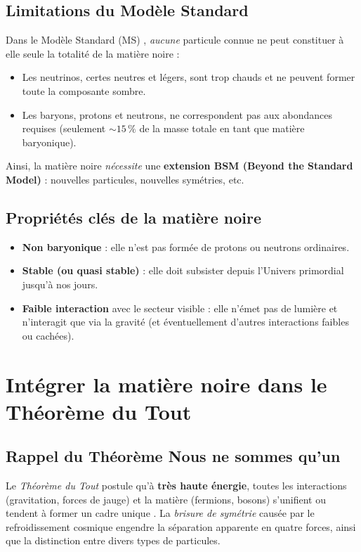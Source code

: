 \documentclass[12pt]{article}
\begin{document}
\subsection{Limitations du Modèle Standard}

Dans le Modèle Standard (MS) \cite{weinberg1995quantum, zee2010qft}, \emph{aucune} particule connue ne peut constituer à elle seule la totalité de la matière noire :
\begin{itemize}
  \item Les neutrinos, certes neutres et légers, sont \og trop chauds \fg{} et ne peuvent former toute la composante sombre.
  \item Les baryons, protons et neutrons, ne correspondent pas aux abondances requises (seulement \(\sim 15\,\%\) de la masse totale en tant que matière baryonique).
\end{itemize}
Ainsi, la matière noire \emph{nécessite} une \textbf{extension BSM (Beyond the Standard Model)} : nouvelles particules, nouvelles symétries, etc.

\subsection{Propriétés clés de la matière noire}

\begin{itemize}
    \item \textbf{Non baryonique} : elle n’est pas formée de protons ou neutrons ordinaires.
    \item \textbf{Stable (ou quasi stable)} : elle doit subsister depuis l’Univers primordial jusqu’à nos jours.
    \item \textbf{Faible interaction} avec le secteur visible : elle n’émet pas de lumière et n’interagit que via la gravité (et éventuellement d’autres interactions faibles ou cachées).
\end{itemize}

\section{Intégrer la matière noire dans le \og Théorème du Tout \fg}
\label{sec:theoreme_mn}

\subsection{Rappel du Théorème \og Nous ne sommes qu’un \fg}

Le \emph{Théorème du Tout} postule qu’à \textbf{très haute énergie}, toutes les interactions (gravitation, forces de jauge) et la matière (fermions, bosons) s’unifient ou tendent à former un cadre unique \cite{langacker1981grand, georgi1974unified}. La \emph{brisure de symétrie} causée par le refroidissement cosmique engendre la séparation apparente en quatre forces, ainsi que la distinction entre divers types de particules.
\end{document}
